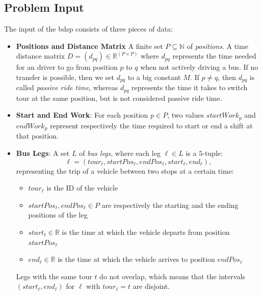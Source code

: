 \documentclass[]{amsart}
\newcommand{\param}{\mathit}
\theoremstyle{plain}
\begin{document}
\subsection{Problem Input}
The input of the \gls{bdsp} consists of three pieces of data:
\begin{itemize}
    \item \textbf{Positions and Distance Matrix} A finite set $P
\subseteq \mathbb{N}$ of \textit{positions}. A time distance matrix $D=(d_{pq})\in \mathbb{R}^{(P\times P)}$ where $d_{pq}$ represents the time needed for an driver to go from position $p$ to $q$ when not actively driving a bus. If no transfer is possible, then we set $d_{pq}$ to a big constant $M$. If $p\neq q$, then $d_{pq}$ is called {\em passive ride time}, whereas $d_{pq}$ represents the time it takes to switch tour at the same position, but is not considered passive ride time. 
    
    \item \textbf{Start and End Work}: For each position $p\in P$, two values $\param{startWork}_p$ and $\param{endWork}_p$ represent respectively the time required to start or end a shift at that position. 
   
    \item \textbf{Bus Legs}: A set $L$ of \textit{bus legs}, where  each leg  $\ell\in L$ is a $5$-tuple:
\[
 \ell =(\param{tour}_\ell,\param{startPos}_\ell, \param{endPos}_\ell, \param{start}_\ell, \param{end}_\ell),
\]
representing the trip of a vehicle between two stops at a certain time: 
\begin{itemize}
    \item $\param{tour}_\ell$ is the ID of the vehicle
    \item $\param{startPos}_\ell, \param{endPos}_\ell\in P$ are respectively the starting and the ending positions of the leg 
    \item $\param{start}_\ell\in \mathbb{R}$ is the time at which the vehicle departs from position $\param{startPos}_\ell$ 
    \item $\param{end}_\ell\in \mathbb{R}$  is the time at which the vehicle arrives to position $\param{endPos}_\ell$
\end{itemize}

\noindent Legs with the same tour $t$ do not overlap, which means that the intervals $(\param{start}_\ell, \param{end}_\ell) $ for $\ell$ with $\param{tour}_\ell = t$ are disjoint. 


\end{itemize}
\end{document}
